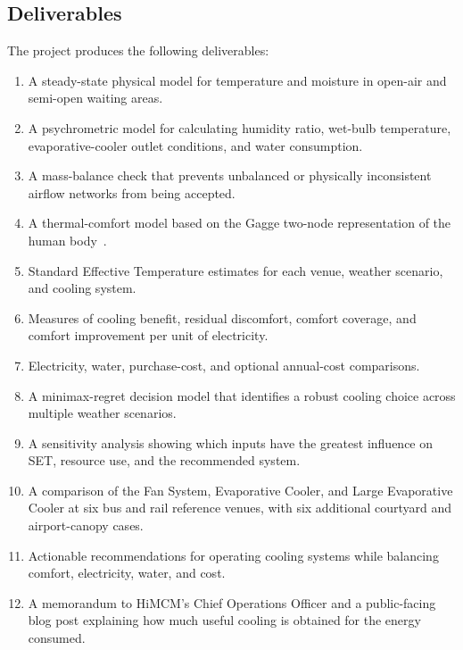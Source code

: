 \vspace{8 pt}

\subsection{Deliverables}

\vspace{8 pt}
  The project produces the following deliverables:

\begin{enumerate}

  \item A steady-state physical model for temperature and moisture in open-air and semi-open waiting areas.
  \item A psychrometric model for calculating humidity ratio, wet-bulb temperature, evaporative-cooler outlet
     conditions, and water consumption.

  \item A mass-balance check that prevents unbalanced or physically inconsistent airflow networks from being
     accepted.

  \item A thermal-comfort model based on the Gagge two-node representation of the human body~\cite{comf_0112_set,cbe_two_node}.
  \item Standard Effective Temperature estimates for each venue, weather scenario, and cooling system.
  \item Measures of cooling benefit, residual discomfort, comfort coverage, and comfort improvement per unit of
     electricity.

  \item Electricity, water, purchase-cost, and optional annual-cost comparisons.
  \item A minimax-regret decision model that identifies a robust cooling choice across multiple weather
     scenarios.

  \item A sensitivity analysis showing which inputs have the greatest influence on SET, resource use, and the
     recommended system.

  \item A comparison of the Fan System, Evaporative Cooler, and Large Evaporative Cooler at six bus and rail
     reference venues, with six additional courtyard and airport-canopy cases.

  \item Actionable recommendations for operating cooling systems while balancing comfort, electricity, water,
     and cost.

  \item A memorandum to HiMCM’s Chief Operations Officer and a public-facing blog post explaining how much
     useful cooling is obtained for the energy consumed.


\end{enumerate}

